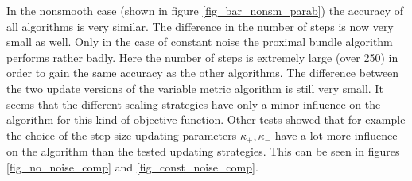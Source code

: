 In the nonsmooth case (shown in figure \ref{fig_bar_nonsm_parab}) the accuracy of all algorithms is very similar. The difference in the number of steps is now very small as well.
Only in the case of constant noise the proximal bundle algorithm performs rather badly. Here the number of steps is extremely large (over 250) in order to gain the same accuracy as the other algorithms.
The difference between the two update versions of the variable metric algorithm is still very small. It seems that the different scaling strategies have only a minor influence on the algorithm for this kind of objective function. Other tests showed that for example the choice of the step size updating parameters \(\kappa_+, \kappa_-\) have a lot more influence on the algorithm than the tested updating strategies. This can be seen in figures \ref{fig_no_noise_comp}  and \ref{fig_const_noise_comp}.%





